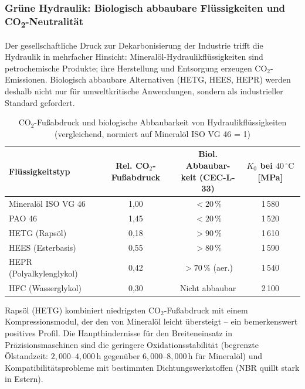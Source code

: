 ﻿\documentclass[a4paper,12pt]{scrreprt}
\theoremstyle{definition}
\begin{document}
\subsubsection{Grüne Hydraulik: Biologisch abbaubare Flüssigkeiten und CO\textsubscript{2}-Neutralität}

Der gesellschaftliche Druck zur Dekarbonisierung der Industrie
trifft die Hydraulik in mehrfacher Hinsicht: Mineralöl-Hydraulik\-flüssigkeiten
sind petrochemische Produkte; ihre Herstellung und Entsorgung erzeugen
CO$_2$-Emissionen. Biologisch abbaubare Alternativen (HETG, HEES, HEPR)
werden deshalb nicht nur für umweltkritische Anwendungen, sondern
als industrieller Standard gefordert.

\begin{table}[H]
  \centering
  \caption{CO$_2$-Fußabdruck und biologische Abbaubarkeit von Hydraulikflüssigkeiten
    (vergleichend, normiert auf Mineralöl ISO VG 46 = 1)}
  \label{tab:co2_hydraulik}
  \begin{tabular}{lccc}
    \toprule
    \textbf{Flüssigkeitstyp}
      & \makecell{\textbf{Rel. CO$_2$-}\\\textbf{Fußabdruck}}
      & \makecell{\textbf{Biol. Abbaubar-}\\\textbf{keit (CEC-L-33)}}
      & \makecell{\textbf{$K_0$ bei $40\,{^\circ}\mathrm{C}$}\\\textbf{[MPa]}} \\
    \midrule
    Mineralöl ISO VG 46     & 1{,}00 & $<20\,\%$         & 1\,580 \\
    PAO 46                  & 1{,}45 & $<20\,\%$         & 1\,520 \\
    HETG (Rapsöl)           & 0{,}18 & $>90\,\%$         & 1\,610 \\
    HEES (Esterbasis)       & 0{,}55 & $>80\,\%$         & 1\,590 \\
    HEPR (Polyalkylenglykol)& 0{,}42 & $>70\,\%$ (aer.)  & 1\,540 \\
    HFC (Wasserglykol)      & 0{,}30 & Nicht abbaubar    & 2\,100 \\
    \bottomrule
  \end{tabular}
\end{table}

Rapsöl (HETG) kombiniert niedrigsten CO$_2$-Fußabdruck mit einem
Kompressionsmodul, der den von Mineralöl leicht übersteigt -- ein
bemerkenswert positives Profil. Die Haupthindernisse für den
Breiteneinsatz in Präzisionsmaschinen sind die geringere Oxidations\-stabilität
(begrenzte Ölstandzeit: $2{,}000$--$4{,}000\,\mathrm{h}$ gegenüber
$6{,}000$--$8{,}000\,\mathrm{h}$ für Mineralöl) und Kompatibilitäts\-probleme
mit bestimmten Dichtungswerkstoffen (NBR quillt stark in Estern).
\end{document}
